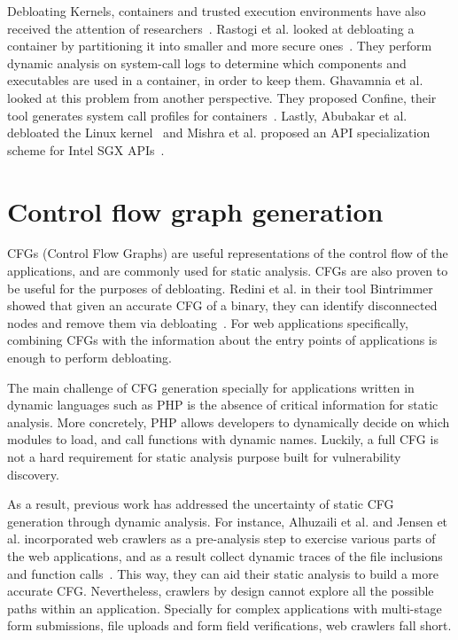 Debloating Kernels, containers and trusted execution environments have also received the attention of researchers~\cite{abubakar2021shard,mishra2021sgxpecial}. 
Rastogi et al. looked at debloating a container by partitioning it into smaller and more secure ones~\cite{rastogi2017Cimplifier}. They perform dynamic analysis on system-call logs to determine which components and executables are used in a container, in order to keep them. 
Ghavamnia et al. looked at this problem from another perspective. 
They proposed Confine, their tool generates system call profiles for containers~\cite{259711}.
Lastly, Abubakar et al. debloated the Linux kernel~\cite{abubakar2021shard} and Mishra et al. proposed an API specialization scheme for Intel SGX APIs~\cite{mishra2021sgxpecial}.

\section{Control flow graph generation}
CFGs (Control Flow Graphs) are useful representations of the control flow of the applications, and are commonly used for static analysis. 
CFGs are also proven to be useful for the purposes of debloating. 
Redini et al. in their tool Bintrimmer showed that given an accurate CFG of a binary, they can identify disconnected nodes and remove them via debloating~\cite{redini2019b}. 
For web applications specifically, combining CFGs with the information about the entry points of applications is enough to perform debloating. 

The main challenge of CFG generation specially for applications written in dynamic languages such as PHP is the absence of critical information for static analysis. 
More concretely, PHP allows developers to dynamically decide on which modules to load, and call functions with dynamic names. 
Luckily, a full CFG is not a hard requirement for static analysis purpose built for vulnerability discovery. 

As a result, previous work has addressed the uncertainty of static CFG generation through dynamic analysis. 
For instance, Alhuzaili et al. and Jensen et al. incorporated web crawlers as a pre-analysis step to exercise various parts of the web applications, and as a result collect dynamic traces of the file inclusions and function calls~\cite{alhuzali2018navex, jensen2012thaps}. 
This way, they can aid their static analysis to build a more accurate CFG. 
Nevertheless, crawlers by design cannot explore all the possible paths within an application. 
Specially for complex applications with multi-stage form submissions, file uploads and form field verifications, web crawlers fall short. 

